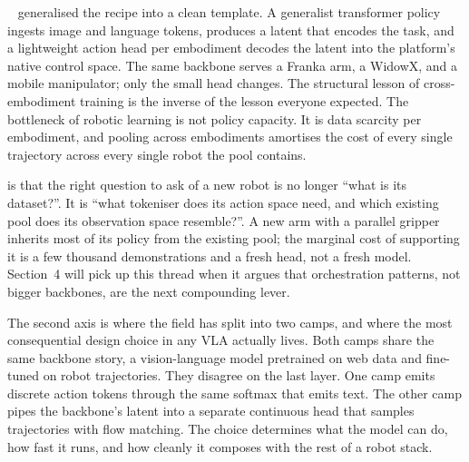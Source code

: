 
~\cite{Octo2024GeneralistPolicy} generalised the recipe into a clean template. A generalist transformer policy ingests image and language tokens, produces a latent that encodes the task, and a lightweight action head per embodiment decodes the latent into the platform's native control space. The same backbone serves a Franka arm, a WidowX, and a mobile manipulator; only the small head changes. The structural lesson of cross-embodiment training is the inverse of the lesson everyone expected. The bottleneck of robotic learning is not policy capacity. It is data scarcity per embodiment, and pooling across embodiments amortises the cost of every single trajectory across every single robot the pool contains.

 is that the right question to ask of a new robot is no longer ``what is its dataset?''. It is ``what tokeniser does its action space need, and which existing pool does its observation space resemble?''. A new arm with a parallel gripper inherits most of its policy from the existing pool; the marginal cost of supporting it is a few thousand demonstrations and a fresh head, not a fresh model. Section~4 will pick up this thread when it argues that orchestration patterns, not bigger backbones, are the next compounding lever.

\vspace{2.5em}

 The second axis is where the field has split into two camps, and where the most consequential design choice in any VLA actually lives. Both camps share the same backbone story, a vision-language model pretrained on web data and fine-tuned on robot trajectories. They disagree on the last layer. One camp emits discrete action tokens through the same softmax that emits text. The other camp pipes the backbone's latent into a separate continuous head that samples trajectories with flow matching. The choice determines what the model can do, how fast it runs, and how cleanly it composes with the rest of a robot stack.


